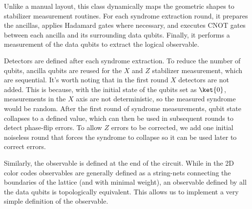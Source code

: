  Unlike a manual layout, this class dynamically maps the geometric shapes to stabilizer measurement routines. For each syndrome extraction round, it prepares the ancillas, applies Hadamard gates where necessary, and executes CNOT gates between each ancilla and its surrounding data qubits. Finally, it performs a measurement of the data qubits to extract the logical observable.

Detectors are defined after each syndrome extraction. To reduce the number of qubits, ancilla qubits are reused for the $X$ and $Z$ stabilizer measurement, which are sequential. It's worth noting that in the first round $X$ detectors are not added. This is because, with the initial state of the qubits set as $\ket{0}$, measurements in the $X$ axis are not deterministic, so the measured syndrome would be random. After the first round of syndrome measurements, qubit state collapses to a defined value, which can then be used in subsequent rounds to detect phase-flip errors. To allow $Z$ errors to be corrected, we add one initial noiseless round that forces the syndrome to collapse so it can be used later to correct errors.

Similarly, the observable is defined at the end of the circuit. While in the 2D color codes observables are generally defined as a string-nets connecting the boundaries of the lattice (and with minimal weight), an observable defined by all the data qubits is topologically equivalent. This allows us to implement a very simple definition of the observable. 

